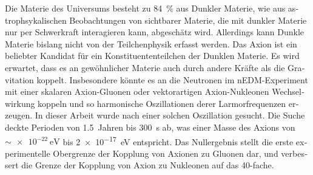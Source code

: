 \begin{otherlanguage}{ngerman}
Die Materie des Universums besteht zu \SI{84}{\percent} aus Dunkler Materie, wie aus astrophsykalischen Beobachtungen von sichtbarer Materie, die mit dunkler Materie nur per Schwerkraft interagieren kann, abgeschätz wird.
Allerdings kann Dunkle Materie bislang nicht von der Teilchenphysik erfasst werden.
Das Axion ist ein beliebter Kandidat für ein Konstituententeilchen der Dunklen Materie.
Es wird erwartet, dass es an gewöhnlicher Materie auch durch andere Kräfte als die Gravitation koppelt.
Insbesondere könnte es an die Neutronen im nEDM-Experiment mit einer skalaren Axion-Gluonen oder vektorartigen Axion-Nukleonen Wechselwirkung koppeln und so harmonische Oszillationen derer Larmorfrequenzen erzeugen.
In dieser Arbeit wurde nach einer solchen Oszillation gesucht.
Die Suche deckte Perioden von \SI{1.5}{Jahren} bis \SI{300}{\second} ab, was einer Masse des Axions von $\sim \SI{e-22}{\electronvolt}$ bis \SI{2e-17}{\electronvolt} entspricht.
Das Nullergebnis stellt die erste experimentelle Obergrenze der Kopplung von Axionen zu Gluonen dar, und verbessert die Grenze der Kopplung von Axion zu Nukleonen auf das 40-fache.

\end{otherlanguage}

\endgroup

\vfill
